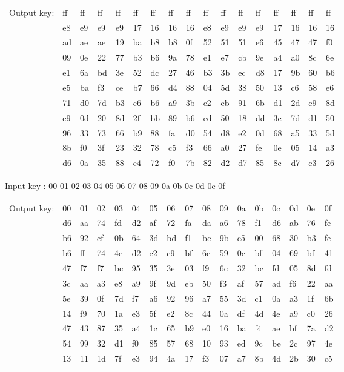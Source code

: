 \begin{small}
  \begin{longtable}{l l l l l l l l l l l l l l l l l}
    Output key: & ff & ff & ff & ff & ff & ff & ff & ff & ff & ff & ff & ff & ff & ff & ff & ff \\
    & e8 & e9 & e9 & e9 & 17 & 16 & 16 & 16 & e8 & e9 & e9 & e9 & 17 & 16 & 16 & 16\\
    & ad & ae & ae & 19 & ba & b8 & b8 & 0f & 52 & 51 & 51 & e6 & 45 & 47 & 47 & f0\\
    & 09 & 0e & 22 & 77 & b3 & b6 & 9a & 78 & e1 & e7 & cb & 9e & a4 & a0 & 8c & 6e\\
    & e1 & 6a & bd & 3e & 52 & dc & 27 & 46 & b3 & 3b & ec & d8 & 17 & 9b & 60 & b6\\
    & e5 & ba & f3 & ce & b7 & 66 & d4 & 88 & 04 & 5d & 38 & 50 & 13 & c6 & 58 & e6\\
    & 71 & d0 & 7d & b3 & c6 & b6 & a9 & 3b & c2 & eb & 91 & 6b & d1 & 2d & c9 & 8d\\
    & e9 & 0d & 20 & 8d & 2f & bb & 89 & b6 & ed & 50 & 18 & dd & 3c & 7d & d1 & 50\\
    & 96 & 33 & 73 & 66 & b9 & 88 & fa & d0 & 54 & d8 & e2 & 0d & 68 & a5 & 33 & 5d\\
    & 8b & f0 & 3f & 23 & 32 & 78 & c5 & f3 & 66 & a0 & 27 & fe & 0e & 05 & 14 & a3\\
    & d6 & 0a & 35 & 88 & e4 & 72 & f0 & 7b & 82 & d2 & d7 & 85 & 8c & d7 & c3 & 26\\
  \end{longtable}

  Input key : 00 01 02 03 04 05 06 07 08 09 0a 0b 0c 0d 0e 0f

  \begin{longtable}{l l l l l l l l l l l l l l l l l}
    Output key: & 00 & 01 & 02 & 03 & 04 & 05 & 06 & 07 & 08 & 09 & 0a & 0b & 
    0c & 0d & 0e & 0f \\
    & d6 & aa & 74 & fd & d2 & af & 72 & fa & da & a6 & 78 & f1 & d6 & ab & 76 & fe \\
    & b6 & 92 & cf & 0b & 64 & 3d & bd & f1 & be & 9b & c5 & 00 & 68 & 30 & b3 & fe \\
    & b6 & ff & 74 & 4e & d2 & c2 & c9 & bf & 6c & 59 & 0c & bf & 04 & 69 & bf & 41 \\
    & 47 & f7 & f7 & bc & 95 & 35 & 3e & 03 & f9 & 6c & 32 & bc & fd & 05 & 8d & fd \\
    & 3c & aa & a3 & e8 & a9 & 9f & 9d & eb & 50 & f3 & af & 57 & ad & f6 & 22 & aa \\
    & 5e & 39 & 0f & 7d & f7 & a6 & 92 & 96 & a7 & 55 & 3d & c1 & 0a & a3 & 1f & 6b \\
    & 14 & f9 & 70 & 1a & e3 & 5f & e2 & 8c & 44 & 0a & df & 4d & 4e & a9 & c0 & 26 \\
    & 47 & 43 & 87 & 35 & a4 & 1c & 65 & b9 & e0 & 16 & ba & f4 & ae & bf & 7a & d2 \\
    & 54 & 99 & 32 & d1 & f0 & 85 & 57 & 68 & 10 & 93 & ed & 9c & be & 2c & 97 & 4e \\
    & 13 & 11 & 1d & 7f & e3 & 94 & 4a & 17 & f3 & 07 & a7 & 8b & 4d & 2b & 30 & c5 \\
  \end{longtable}


\end{small}
